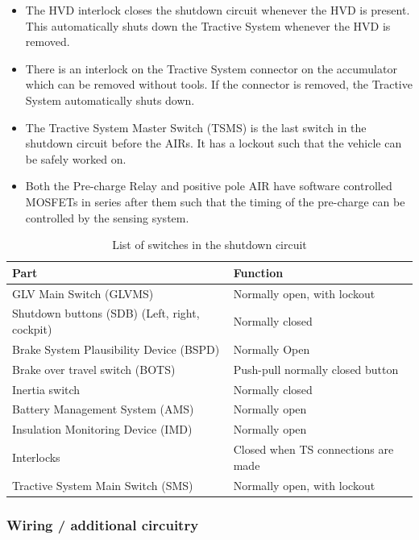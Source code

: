 \documentclass{article}
\begin{document}
\begin{itemize}
		\item The HVD interlock closes the shutdown circuit whenever the HVD is present. This automatically shuts down the Tractive System whenever the HVD is removed. 
		\item There is an interlock on the Tractive System connector on the accumulator which can be removed without tools. If the connector is removed, the Tractive System automatically shuts down. 
		\item The Tractive System Master Switch (TSMS) is the last switch in the shutdown circuit before the AIRs. It has a lockout such that the vehicle can be safely worked on. 
		\item Both the Pre-charge Relay and positive pole AIR have software controlled MOSFETs in series after them such that the timing of the pre-charge can be controlled by the sensing system.  
	\end{itemize}

	\begin{table}[H]
        \centering
        \begin{tabular}{|l|l|}
        \hline
            \textbf{Part} & \textbf{Function} \\ \hline
            GLV Main Switch (GLVMS) & Normally open, with lockout \\ \hline
            Shutdown buttons (SDB) (Left, right, cockpit) & Normally closed \\ \hline
            Brake System Plausibility Device (BSPD) & Normally Open \\ \hline
            Brake over travel switch (BOTS) & Push-pull normally closed button \\ \hline
            Inertia switch & Normally closed \\ \hline
            Battery Management System (AMS) & Normally open \\ \hline
            Insulation Monitoring Device (IMD) & Normally open \\ \hline
            Interlocks & Closed when TS connections are made \\ \hline
            Tractive System Main Switch (SMS) & Normally open, with lockout \\ \hline
        \end{tabular}
        \caption{List of switches in the shutdown circuit}
        \label{switchlist}
    \end{table}

\subsubsection{Wiring / additional circuitry} \label{sec:shutdown_wiring}
\end{document}
